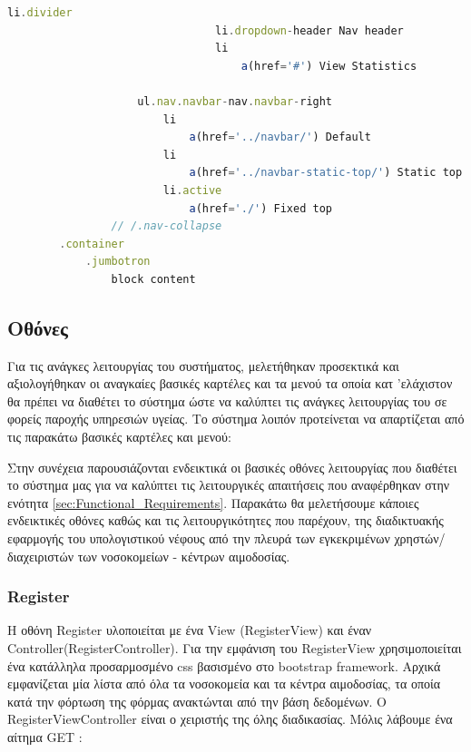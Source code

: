 \begin{lstlisting}[language=Javascript]
                                li.divider
                                li.dropdown-header Nav header
                                li
                                    a(href='#') View Statistics

                    ul.nav.navbar-nav.navbar-right
                        li
                            a(href='../navbar/') Default
                        li
                            a(href='../navbar-static-top/') Static top
                        li.active
                            a(href='./') Fixed top
                // /.nav-collapse
        .container
            .jumbotron
                block content

		\end{lstlisting}

		
	\subsection{Οθόνες}
	
		Για τις ανάγκες λειτουργίας του συστήματος, μελετήθηκαν προσεκτικά και αξιολογήθηκαν οι αναγκαίες βασικές καρτέλες και τα μενού τα οποία κατ 'ελάχιστον θα πρέπει να διαθέτει το σύστημα ώστε να καλύπτει τις ανάγκες λειτουργίας του σε φορείς παροχής υπηρεσιών υγείας. Το σύστημα λοιπόν προτείνεται να απαρτίζεται από τις παρακάτω βασικές καρτέλες και μενού:

		Στην συνέχεια παρουσιάζονται ενδεικτικά οι βασικές οθόνες λειτουργίας που διαθέτει το σύστημα μας για να καλύπτει τις λειτουργικές απαιτήσεις που αναφέρθηκαν στην ενότητα \ref{sec:Functional_Requirements}. Παρακάτω θα μελετήσουμε κάποιες ενδεικτικές οθόνες καθώς και τις λειτουργικότητες που παρέχουν, της διαδικτυακής εφαρμογής του υπολογιστικού νέφους από την πλευρά των εγκεκριμένων χρηστών/διαχειριστών των νοσοκομείων - κέντρων αιμοδοσίας. 
	
		\subsubsection{Register}
		
		Η οθόνη Register υλοποιείται με ένα View (RegisterView) και έναν Controller(RegisterController). Για την εμφάνιση του RegisterView χρησιμοποιείται ένα κατάλληλα προσαρμοσμένο css βασισμένο στο bootstrap framework. Αρχικά εμφανίζεται μία λίστα από όλα τα νοσοκομεία και τα κέντρα αιμοδοσίας, τα οποία κατά την φόρτωση της φόρμας ανακτώνται από την βάση δεδομένων. O RegisterViewController είναι ο χειριστής της όλης διαδικασίας. Μόλις λάβουμε ένα αίτημα GET :
		
